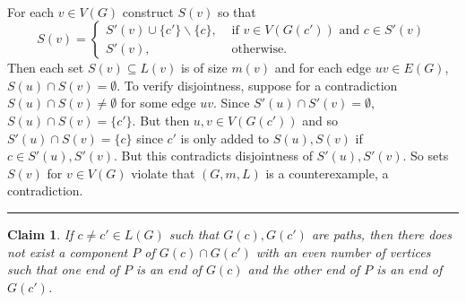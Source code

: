 \documentclass[letterpaper,12pt,oneside,onecolumn]{article}
\newenvironment{proof}{{\bf Proof:  }}{\hfill\rule{2mm}{2mm}}
\newtheorem{claim}[fact]{Claim}
\begin{document}
\begin{proof}
	\paragraph{}
	For each $v \in V(G)$ construct $S(v)$ so that
	$$S(v) = \begin{cases}
		S'(v) \cup \{c'\}\backslash \{c\}, &\text{ if } v \in V(G(c')) \text{ and } c \in S'(v) \\
		S'(v), &\text{ otherwise}.
	\end{cases}$$
	Then each set $S(v) \subseteq L(v)$ is of size $m(v)$ and for each edge $uv \in E(G)$, $S(u) \cap S(v) = \emptyset$. To verify disjointness, suppose for a contradiction $S(u) \cap S(v) \neq \emptyset$ for some edge $uv$. Since $S'(u) \cap S'(v) = \emptyset$, $S(u) \cap S(v) = \{c'\}$. But then $u,v \in V(G(c'))$ and so $S'(u) \cap S(v) = \{c\}$ since $c'$ is only added to $S(u), S(v)$ if $c \in S'(u), S'(v)$. But this contradicts disjointness of $S'(u), S'(v)$. So sets $S(v)$ for $v \in V(G)$ violate that $(G,m,L)$ is a counterexample, a contradiction.
\end{proof}
	\begin{claim}
		If $c \neq c' \in L(G)$ such that $G(c), G(c')$ are paths, then there does not exist a component $P$ of $G(c) \cap G(c')$ with an even number of vertices such that one end of $P$ is an end of $G(c)$ and the other end of $P$ is an end of $G(c')$.
	\end{claim}
\end{document}
